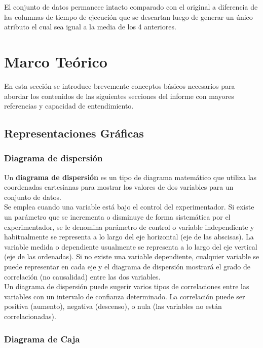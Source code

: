 \documentclass[osajnl,twocolumn,showpacs,superscriptaddress,10pt]{revtex4-1} %
\begin{document}
El conjunto de datos permanece intacto comparado con el original a diferencia de las columnas de tiempo de ejecución que se descartan luego de generar un único atributo el cual sea igual a la media de los 4 anteriores. \\

\section{Marco Teórico}

En esta sección se introduce brevemente conceptos básicos necesarios para abordar los contenidos de las siguientes secciones del informe con mayores referencias y capacidad de entendimiento. \\

\subsection{Representaciones Gráficas}

\subsubsection{Diagrama de dispersión}

Un \textbf{diagrama de dispersión} es un tipo de diagrama matemático que utiliza las coordenadas cartesianas para mostrar los valores de dos variables para un conjunto de datos. \\

Se emplea cuando una variable está bajo el control del experimentador. Si existe un parámetro que se incrementa o disminuye de forma sistemática por el experimentador, se le denomina parámetro de control o variable independiente y habitualmente se representa a lo largo del eje horizontal (eje de las abscisas). La variable medida o dependiente usualmente se representa a lo largo del eje vertical (eje de las ordenadas). Si no existe una variable dependiente, cualquier variable se puede representar en cada eje y el diagrama de dispersión mostrará el grado de correlación (no causalidad) entre las dos variables. \\

Un diagrama de dispersión puede sugerir varios tipos de correlaciones entre las variables con un intervalo de confianza determinado. La correlación puede ser positiva (aumento), negativa (descenso), o nula (las variables no están correlacionadas).

\subsubsection{Diagrama de Caja}
\end{document}

